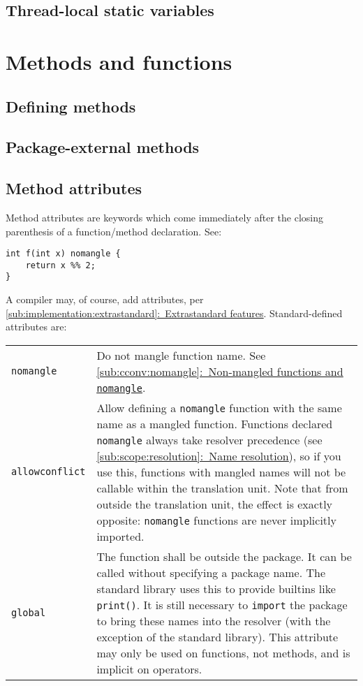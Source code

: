 \documentclass{article}
\newcommand{\textref}[2]{\hyperref[#1]{\underline{\ref*{#1}:~#2}}}
\begin{document}
\subsection{Thread-local static variables}
\label{sub:classes:threadlocal}

\section{Methods and functions}
\label{sec:methods}

\subsection{Defining methods}
\label{sub:methods:definition}

\subsection{Package-external methods}
\label{sub:methods:extern}

\subsection{Method attributes}
\label{sub:methods:attributes}
Method attributes are keywords which come immediately after the closing
parenthesis of a function/method declaration. See:
\begin{verbatim}
int f(int x) nomangle {
    return x %% 2;
}
\end{verbatim}

A compiler may, of course, add attributes, per
\textref{sub:implementation:extrastandard}{Extrastandard features}.
Standard-defined attributes are:
\begin{center}
\begin{tabular}{|l|p{4in}|}
\hline
\texttt{nomangle} & Do not mangle function name. See
  \textref{sub:cconv:nomangle}{Non-mangled functions and \texttt{nomangle}}. \\
\texttt{allowconflict} & Allow defining a \texttt{nomangle} function with the
  same name as a mangled function.
  Functions declared
  \texttt{nomangle} always take resolver precedence (see
  \textref{sub:scope:resolution}{Name resolution}), so if you use this,
  functions with mangled names will not be callable within the translation
  unit. Note that from outside the translation unit, the effect is exactly
  opposite: \texttt{nomangle} functions are never implicitly imported. \\
\texttt{global} & The function shall be outside the package. It can be called
  without specifying a package name. The standard library uses this to provide
  builtins like \texttt{print()}. It is still necessary to \texttt{import} the
  package to bring these names into the resolver (with the exception of the
  standard library). This attribute may only be used on functions, not methods,
  and is implicit on operators. \\
\hline
\end{tabular}
\end{center}
\end{document}
